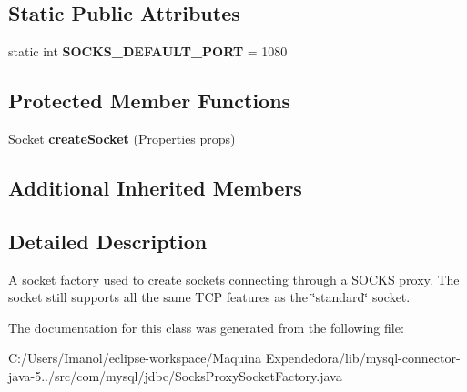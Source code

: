 \subsection*{Static Public Attributes}
\begin{DoxyCompactItemize}
\item 
\mbox{\label{classcom_1_1mysql_1_1jdbc_1_1_socks_proxy_socket_factory_a34a841db3012897c5bc707da24607beb}} 
static int {\bfseries S\+O\+C\+K\+S\+\_\+\+D\+E\+F\+A\+U\+L\+T\+\_\+\+P\+O\+RT} = 1080
\end{DoxyCompactItemize}
\subsection*{Protected Member Functions}
\begin{DoxyCompactItemize}
\item 
\mbox{\label{classcom_1_1mysql_1_1jdbc_1_1_socks_proxy_socket_factory_a1ffc6a9a2bc85554a615de5d51e23e3f}} 
Socket {\bfseries create\+Socket} (Properties props)
\end{DoxyCompactItemize}
\subsection*{Additional Inherited Members}


\subsection{Detailed Description}
A socket factory used to create sockets connecting through a S\+O\+C\+KS proxy. The socket still supports all the same T\+CP features as the \char`\"{}standard\char`\"{} socket. 

The documentation for this class was generated from the following file\+:\begin{DoxyCompactItemize}
\item 
C\+:/\+Users/\+Imanol/eclipse-\/workspace/\+Maquina Expendedora/lib/mysql-\/connector-\/java-\/5../src/com/mysql/jdbc/Socks\+Proxy\+Socket\+Factory.\+java\end{DoxyCompactItemize}
